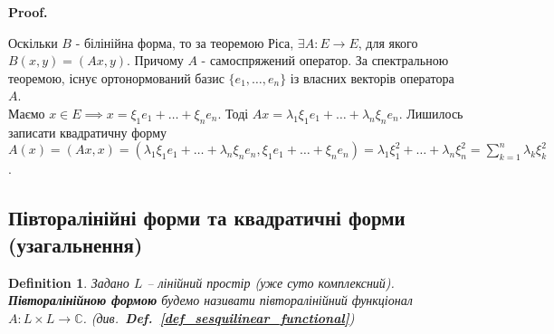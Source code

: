 \documentclass[a4paper, 10pt]{article}
\makeatletter
\theoremstyle{theoremdd}
\newtheorem{definition}[theorem]{Definition}
\newcommand\defref[1]{\textbf{Def.~\ref{#1}}}
\renewenvironment{proof}[1][Proof.\\]{\par
\pushQED{\hfill \qed}%
\normalfont \topsep6\p@\@plus6\p@\relax
\trivlist
\item\relax
{\bfseries
#1\@addpunct{.}}\hspace\labelsep\ignorespaces
}{%
\popQED\endtrivlist\@endpefalse
}
\makeatother
\begin{document}
\begin{proof}
Оскільки $B$ - білінійна форма, то за теоремою Ріса, $\exists A: E \to E$, для якого $B(x,y) = (Ax,y)$. Причому $A$ - самоспряжений оператор. За спектральною теоремою, існує ортонормований базис $\{e_1,\dots,e_n\}$ із власних векторів оператора $A$.\\
Маємо $x \in E \implies x = \xi_1 e_1 + \dots + \xi_n e_n$. Тоді $Ax = \lambda_1 \xi_1 e_1 + \dots + \lambda_n \xi_n e_n$. Лишилось записати квадратичну форму\\
$A(x) = (Ax,x) = (\lambda_1 \xi_1 e_1 + \dots + \lambda_n \xi_n e_n, \xi_1 e_1 + \dots + \xi_n e_n) = \lambda_1 \xi_1^2 + \dots + \lambda_n \xi_n^2 = \displaystyle\sum_{k=1}^n \lambda_k \xi_k^2$.
\end{proof}

\subsection{Півторалінійні форми та квадратичні форми (узагальнення)}
\begin{definition}
Задано $L$ -- лінійний простір (уже суто комплексний).\\
\textbf{Півторалінійною формою} будемо називати півторалінійний функціонал $A \colon L \times L \to \mathbb{C}$. (див.\ \defref{def_sesquilinear_functional})
\end{definition}
\end{document}

